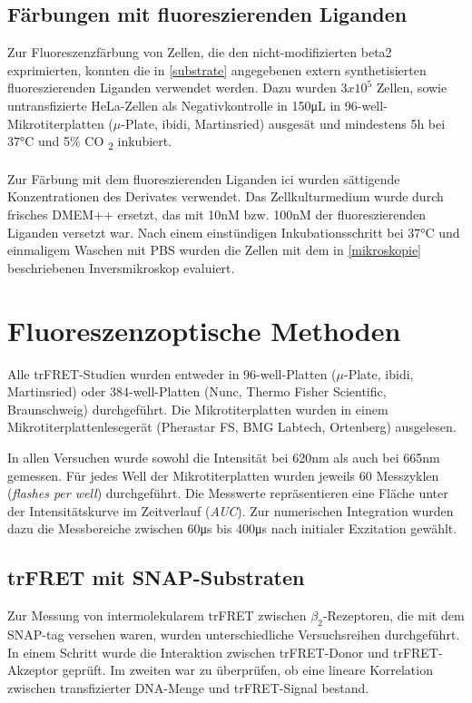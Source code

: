 \subsection{Färbungen mit fluoreszierenden Liganden}
Zur Fluoreszenzfärbung von Zellen, die den nicht-modifizierten \gls{beta2} exprimierten, konnten die in \ref{substrate} angegebenen extern synthetisierten fluoreszierenden Liganden verwendet werden. Dazu wurden $3x10^5$ Zellen, sowie untransfizierte HeLa-Zellen als Negativkontrolle in 150\si{\micro\liter} in 96-well-Mikrotiterplatten ($\mu$-Plate, ibidi, Martinsried) ausgesät und mindestens 5\si{\hour} bei 37\si{\celsius} und 5\% CO \textsubscript{2} inkubiert.
\\ \\
Zur Färbung mit dem fluoreszierenden Liganden \gls{ici} wurden sättigende Konzentrationen des Derivates verwendet. Das Zellkulturmedium wurde durch frisches DMEM++ ersetzt, das mit 10\si{\nano M} bzw. 100\si{\nano M} der fluoreszierenden Liganden versetzt war. Nach einem einstündigen Inkubationsschritt bei 37\si{\celsius} und einmaligem Waschen mit PBS wurden die Zellen mit dem in \ref{mikroskopie} beschriebenen Inversmikroskop evaluiert.

\section{Fluoreszenzoptische Methoden}

Alle trFRET-Studien wurden entweder in 96-well-Platten ($\mu$-Plate, ibidi, Martinsried) oder 384-well-Platten (Nunc, Thermo Fisher Scientific, Braunschweig) durchgeführt. Die Mikrotiterplatten wurden in einem Mikrotiterplattenlesegerät (Pherastar FS, BMG Labtech, Ortenberg) ausgelesen. 

In allen Versuchen wurde sowohl die Intensität bei 620\si{\nano\meter} als auch bei 665\si{\nano\meter} gemessen. Für jedes Well der Mikrotiterplatten wurden jeweils 60 Messzyklen (\textit{flashes per well}) durchgeführt. Die Messwerte repräsentieren eine Fläche unter der Intensitätskurve im Zeitverlauf (\textit{AUC}). Zur numerischen Integration wurden dazu die Messbereiche zwischen 60\si{\micro\second} bis 400\si{\micro\second} nach initialer Exzitation gewählt. 

\subsection{trFRET mit SNAP-Substraten}
Zur Messung von intermolekularem trFRET zwischen $\beta_2$-Rezeptoren, die mit dem SNAP-tag versehen waren, wurden unterschiedliche Versuchsreihen durchgeführt. In einem Schritt wurde die Interaktion zwischen trFRET-Donor und trFRET-Akzeptor geprüft. Im zweiten war zu überprüfen, ob eine lineare Korrelation zwischen transfizierter DNA-Menge und trFRET-Signal bestand.

